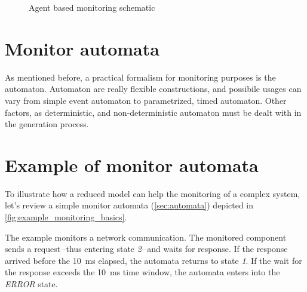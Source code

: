 \begin{figure}[h]
	\centering

	\caption{Agent based monitoring schematic}
\label{fig:agent_based_monitoring}
\end{figure}

\section{Monitor automata}

As mentioned before, a practical formalism for monitoring purposes is the automaton. Automaton are really flexible constructions, and possibile usages can vary from simple event automaton to parametrized, timed automaton. Other factors, as deterministic, and non-deterministic automaton must be dealt with in the generation process.

\section{Example of monitor automata}

To illustrate how a reduced model can help the monitoring of a complex system, let's review a simple monitor automata (\cref{sec:automata}) depicted in \cref{fig:example_monitoring_basics}.

The example monitors a network communication. The monitored component sends a request\,--thus entering state \emph{2}--\,and waits for response. If the response arrived before the \SI{10}{\ms} elapsed, the automata returns to state \emph{1}. If the wait for the response exceeds the \SI{10}{ms} time window, the automata enters into the \emph{ERROR} state.

